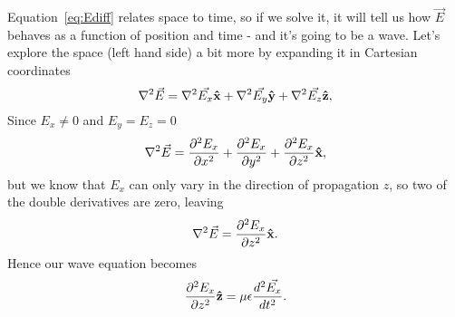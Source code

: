 \documentclass{tufte-handout}
\newcommand{\uvec}[1]{{\bm{\hat{\textnormal{\bfseries #1}}}}}
\begin{document}
Equation~\ref{eq:Ediff} relates space to time, so if we solve it, it will tell us how $\vec{E}$ behaves as a function of position and time - and it's going to be a wave. Let's explore the space (left hand side) a bit more by expanding it in Cartesian coordinates
\begin{equation}
\nabla^2\vec{E} = \nabla^2\vec{E_x}\uvec{x} + \nabla^2\vec{E_y}\uvec{y} + \nabla^2\vec{E_z}\uvec{z},  
\end{equation}
Since $E_x \neq 0$ and $E_y = E_z = 0$
\begin{equation}
\nabla^2\vec{E} = \frac{\partial^2E_x}{\partial x^2} + \frac{\partial^2E_x}{\partial y^2} + \frac{\partial^2E_x}{\partial z^2} \uvec{x}, 
\end{equation}
but we know that $E_x$ can only vary in the direction of propagation $z$, so two of the double derivatives are zero, leaving
\begin{equation}
\nabla^2\vec{E} =\frac{\partial^2E_x}{\partial z^2}\uvec{x}. 
\end{equation}
Hence our wave equation becomes 
\begin{equation}
\frac{\partial^2 E_x}{\partial z^2}\uvec{z}  = \mu\epsilon \frac{d^2\vec{E_x}}{dt^2}. \label{eq:Exdiff}
\end{equation}
\end{document}

